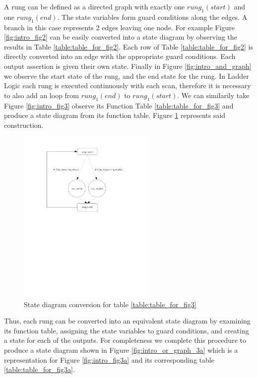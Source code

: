 A rung can be defined as a directed graph with exactly one $rung_1(start)$ and one $rung_1(end)$. The state variables form guard conditions along the edges. A branch in this case represents 2 edges leaving one node. For example Figure \ref{fig:intro_fig2}
can be easily converted into a state diagram by observing the results in Table \ref{table:table_for_fig2}. 
Each row of Table \ref{table:table_for_fig2} is directly converted into an edge with the appropriate guard conditions.
Each output assertion is given their own state. Finally in Figure \ref{fig:intro_and_graph} we observe the start state of the rung, and the end state for the rung. In Ladder Logic each rung is executed continuously with each scan, therefore it is necessary to also add an loop from $rung_1(end)$ to $rung_1(start)$. We can similarily take Figure \ref{fig:intro_fig3} observe its Function Table \ref{table:table_for_fig3} and produce a state diagram from its function table. Figure \ref{fig:intro_or_graph} represents said construction.


\begin{figure}[h]
    \centering
    \includegraphics[trim= 00mm 140mm 40mm 10mm, clip, width=250px]{./images/intro_or_graph.pdf} %
    \caption{State diagram conversion for table \ref{table:table_for_fig3}}
    \label{fig:intro_or_graph}
\end{figure}

Thus, each rung can be converted into an equivalent state diagram by examining its 
function table, assigning the state variables to guard conditions, and creating a
state for each of the outputs. For completeness we complete this procedure to produce
a state diagram shown in Figure \ref{fig:intro_or_graph_3a} which is a representation for 
Figure \ref{fig:intro_fig3a} and its
corresponding table \ref{table:table_for_fig3a}.


